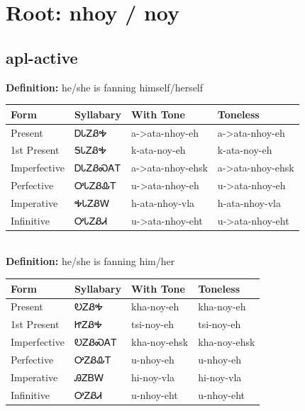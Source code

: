 \documentclass{article}%
\begin{document}
%
\normalsize%
\section*{Root: nhoy / noy}%
\subsection*{apl-active}%
\textbf{Definition: }%
he/she is fanning himself/herself%
\\[0.5em]%
\begin{tabular}{|l|l|l|l|}%
\hline%
\textbf{Form}&\textbf{Syllabary}&\textbf{With Tone}&\textbf{Toneless}\\%
\hline%
Present&ᎠᏓᏃᏰᎭ&a{-}>ata{-}nhoy{-}eh&a{-}>ata{-}nhoy{-}eh\\%
1st Present&ᎦᏓᏃᏰᎭ&k{-}ata{-}noy{-}eh&k{-}ata{-}noy{-}eh\\%
Imperfective&ᎠᏓᏃᏰᏍᎪᎢ&a{-}>ata{-}nhoy{-}ehsk&a{-}>ata{-}nhoy{-}ehsk\\%
Perfective&ᎤᏓᏃᏰᎲᎢ&u{-}>ata{-}nhoy{-}eh&u{-}>ata{-}nhoy{-}eh\\%
Imperative&ᎭᏓᏃᏰᎳ&h{-}ata{-}nhoy{-}vla&h{-}ata{-}nhoy{-}vla\\%
Infinitive&ᎤᏓᏃᏰᏗ&u{-}>ata{-}nhoy{-}eht&u{-}>ata{-}nhoy{-}eht\\%
\hline%
\end{tabular}%
\\[1em]%
\textbf{Definition: }%
he/she is fanning him/her%
\\[0.5em]%
\begin{tabular}{|l|l|l|l|}%
\hline%
\textbf{Form}&\textbf{Syllabary}&\textbf{With Tone}&\textbf{Toneless}\\%
\hline%
Present&ᎧᏃᏰᎭ&kha{-}noy{-}eh&kha{-}noy{-}eh\\%
1st Present&ᏥᏃᏰᎭ&tsi{-}noy{-}eh&tsi{-}noy{-}eh\\%
Imperfective&ᎧᏃᏰᏍᎪᎢ&kha{-}noy{-}ehsk&kha{-}noy{-}ehsk\\%
Perfective&ᎤᏃᏰᎲᎢ&u{-}nhoy{-}eh&u{-}nhoy{-}eh\\%
Imperative&ᎯᏃᏴᎳ&hi{-}noy{-}vla&hi{-}noy{-}vla\\%
Infinitive&ᎤᏃᏰᏗ&u{-}nhoy{-}eht&u{-}nhoy{-}eht\\%
\hline%
\end{tabular}%
\\[1em]%
\end{document}
